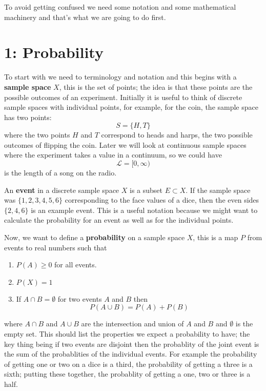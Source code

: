 \documentclass[11pt,a4paper]{scrartcl}
\begin{document}
To avoid getting confused we need some notation and some mathematical
machinery and that's what we are going to do first.

\section*{1: Probability}

To start with we need to terminology and notation and this begins with
a \textbf{sample space} $X$, this is the set of points; the
idea is that these points are the possible outcomes of an
experiment. Initially it is useful to think of discrete sample spaces
with individual points, for example, for the coin, the sample space
has two points:
\begin{equation}
S=\{H,T\}
\end{equation}
where the two points $H$ and $T$ correspond to heads and harps, the
two possible outcomes of flipping the coin. Later we will look at
continuous sample spaces where the experiment takes a value in a
continuum, so we could have
\begin{equation}
\mathcal{L}=[0,\infty)
\end{equation}
is the length of a song on the radio.

An \textbf{event} in a discrete sample space $X$ is a subset
$E\subset X$. If the sample space was $\{1,2,3,4,5,6\}$
corresponding to the face values of a dice, then the even sides
$\{2,4,6\}$ is an example event. This is a useful notation because we
might want to calculate the probability for an event as well as for
the individual points.

Now, we want to define a \textbf{probability} on a sample space $X$,
this is a map $P$ from events to real numbers such that
\begin{enumerate}
\item $P(A)\ge 0$ for all events.
\item $P(X)=1$
\item If $A\cap B=\emptyset$ for two events $A$ and $B$ then 
\begin{equation}
P(A\cup B)=P(A)+P(B)
\end{equation}
\end{enumerate}
where $A\cap B$ and $A\cup B$ are the intersection and union of $A$
and $B$ and $\emptyset$ is the empty set. This should list the
properties we expect a probability to have; the key thing being if two
events are disjoint then the probablity of the joint event is the sum
of the probablities of the individual events. For example the
probability of getting one or two on a dice is a third, the
probability of getting a three is a sixth; putting these together, the
probablity of getting a one, two or three is a half.
\end{document}
